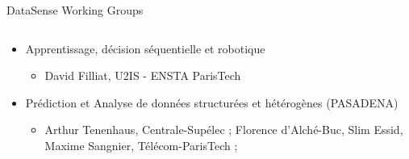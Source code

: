 \begin{frame}{DataSense Working Groups}
\begin{columns}
\begin{column}[t]{6.5cm}
\begin{itemize}
      \item Apprentissage, décision séquentielle et robotique 
        \begin{itemize}
        \item David Filliat, U2IS - ENSTA ParisTech 
        \end{itemize}

      \item Prédiction et Analyse de données structurées et hétérogènes (PASADENA) 
        \begin{itemize}
        \item Arthur Tenenhaus, Centrale-Supélec ; Florence d’Alché-Buc,
          Slim Essid,  Maxime Sangnier, Télécom-ParisTech ;
        \end{itemize}

      \end{itemize}
    \end{column}
  \end{columns}
\end{frame}

